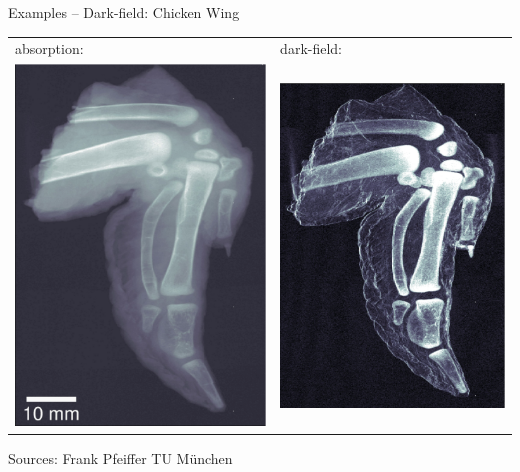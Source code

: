 \begin{frame}{Examples -- Dark-field: Chicken Wing}
    \begin{center}
        \begin{tabular}{ll}
            absorption:                                             & dark-field:                                             \\
            \includegraphics[width=0.25\linewidth]{images/wing1.eps} & \includegraphics[width=0.25\linewidth]{images/wing2.eps}
        \end{tabular}
    \end{center}
    \begin{center}
        \begin{flushright}
            \scriptsize Sources: Frank Pfeiffer TU München
        \end{flushright}
    \end{center}
\end{frame}
